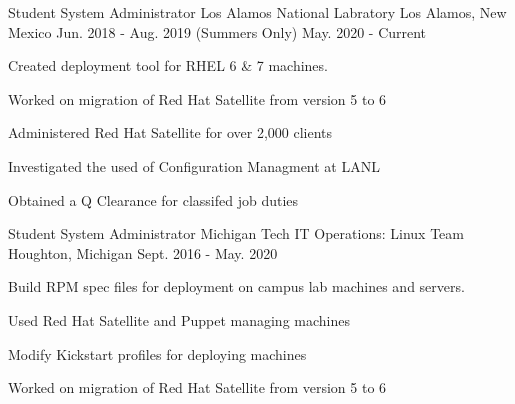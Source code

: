 

\begin{cventries}

  \cventry
    {Student System Administrator} %
    {Los Alamos National Labratory} %
    {Los Alamos, New Mexico} %
    {Jun. 2018 - Aug. 2019 (Summers Only) May. 2020 - Current} %
    {
      \begin{cvitems} %
      \item {Created deployment tool for RHEL 6 \& 7 machines.}
        \item {Worked on migration of Red Hat Satellite from version 5 to 6}
        \item {Administered Red Hat Satellite for over 2,000 clients}
        \item {Investigated the used of Configuration Managment at LANL}
        \item {Obtained a Q Clearance for classifed job duties}
      \end{cvitems}
    }

  \cventry
    {Student System Administrator} %
    {Michigan Tech IT Operations: Linux Team} %
    {Houghton, Michigan} %
    {Sept. 2016 - May. 2020} %
    {
      \begin{cvitems} %
        \item {Build RPM spec files for deployment on campus lab machines and servers.}
        \item {Used Red Hat Satellite and Puppet managing machines}
        \item {Modify Kickstart profiles for deploying machines}	
        \item {Worked on migration of Red Hat Satellite from version 5 to 6}
      \end{cvitems}
    }


\end{cventries}
